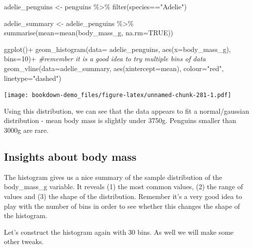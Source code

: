 \documentclass[
]{book}
\newenvironment{Shaded}{\begin{snugshade}}{\end{snugshade}}
\newcommand{\AttributeTok}[1]{\textcolor[rgb]{0.77,0.63,0.00}{#1}}
\newcommand{\CommentTok}[1]{\textcolor[rgb]{0.56,0.35,0.01}{\textit{#1}}}
\newcommand{\ConstantTok}[1]{\textcolor[rgb]{0.00,0.00,0.00}{#1}}
\newcommand{\DecValTok}[1]{\textcolor[rgb]{0.00,0.00,0.81}{#1}}
\newcommand{\FunctionTok}[1]{\textcolor[rgb]{0.00,0.00,0.00}{#1}}
\newcommand{\NormalTok}[1]{#1}
\newcommand{\OtherTok}[1]{\textcolor[rgb]{0.56,0.35,0.01}{#1}}
\newcommand{\SpecialCharTok}[1]{\textcolor[rgb]{0.00,0.00,0.00}{#1}}
\newcommand{\StringTok}[1]{\textcolor[rgb]{0.31,0.60,0.02}{#1}}
\begin{document}
\begin{Shaded}
\begin{Highlighting}[]
\NormalTok{adelie\_penguins }\OtherTok{\textless{}{-}}\NormalTok{ penguins }\SpecialCharTok{\%\textgreater{}\%} 
  \FunctionTok{filter}\NormalTok{(species}\SpecialCharTok{==}\StringTok{"Adelie"}\NormalTok{)}

\NormalTok{adelie\_summary }\OtherTok{\textless{}{-}}\NormalTok{ adelie\_penguins }\SpecialCharTok{\%\textgreater{}\%} 
  \FunctionTok{summarise}\NormalTok{(}\AttributeTok{mean=}\FunctionTok{mean}\NormalTok{(body\_mass\_g, }
                      \AttributeTok{na.rm=}\ConstantTok{TRUE}\NormalTok{))}

\FunctionTok{ggplot}\NormalTok{()}\SpecialCharTok{+}
  \FunctionTok{geom\_histogram}\NormalTok{(}\AttributeTok{data=}\NormalTok{ adelie\_penguins,}
                 \FunctionTok{aes}\NormalTok{(}\AttributeTok{x=}\NormalTok{body\_mass\_g),}
                 \AttributeTok{bins=}\DecValTok{10}\NormalTok{)}\SpecialCharTok{+} \CommentTok{\#remember it is a good idea to try multiple bins of data}
  \FunctionTok{geom\_vline}\NormalTok{(}\AttributeTok{data=}\NormalTok{adelie\_summary,}
             \FunctionTok{aes}\NormalTok{(}\AttributeTok{xintercept=}\NormalTok{mean),}
             \AttributeTok{colour=}\StringTok{"red"}\NormalTok{,}
             \AttributeTok{linetype=}\StringTok{"dashed"}\NormalTok{)}
\end{Highlighting}
\end{Shaded}

\texttt{[image: bookdown-demo\_files/figure-latex/unnamed-chunk-281-1.pdf]}

Using this distribution, we can see that the data appears to fit a normal/gaussian distribution - mean body mass is slightly under 3750g. Penguins smaller than 3000g are rare.

\hypertarget{insights-about-body-mass}{%
\subsection{Insights about body mass}\label{insights-about-body-mass}}

The histogram gives us a nice summary of the sample distribution of the body\_mass\_g variable. It reveals (1) the most common values, (2) the range of values and (3) the shape of the distribution. Remember it's a very good idea to play with the number of bins in order to see whether this changes the shape of the histogram.

Let's construct the histogram again with 30 bins. As well we will make some other tweaks.
\end{document}

